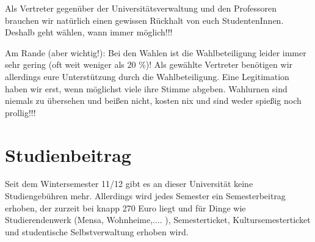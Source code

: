 Als Vertreter gegenüber der Universitätsverwaltung und den Professoren brauchen wir natürlich einen gewissen Rückhalt von euch StudentenInnen. Deshalb geht wählen, wann immer möglich!!!

Am Rande (aber wichtig!): Bei den Wahlen ist die Wahlbeteiligung leider immer sehr gering (oft weit weniger als 20 \%)! Als gewählte Vertreter benötigen wir allerdings eure Unterstützung durch die Wahlbeteiligung. Eine Legitimation haben wir erst, wenn möglichst viele ihre Stimme abgeben. Wahlurnen sind niemals zu übersehen und beißen nicht, kosten nix und sind weder spießig noch prollig!!!

\section*{Studienbeitrag}
Seit dem Wintersemester 11/12 gibt es an dieser Universität keine Studiengebühren mehr.
Allerdings wird jedes Semester ein Semesterbeitrag erhoben, der zurzeit bei knapp 270 Euro liegt und für Dinge wie Studierendenwerk (Mensa, Wohnheime,.... ), Semesterticket, Kultursemesterticket und studentische Selbstverwaltung erhoben wird.
